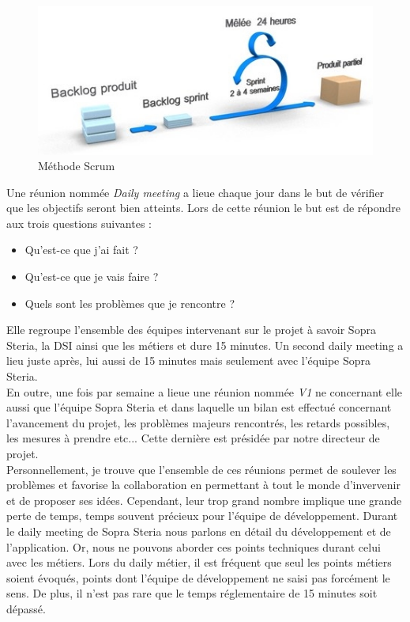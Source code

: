 \begin{figure}[h!]
	\includegraphics[scale=0.7]{images/travailBP1818/scrum.jpg}
	\centering
	\caption{Méthode Scrum}
	\label{scrum}
\end{figure}

	Une réunion nommée \textit{Daily meeting} a lieue chaque jour dans le but de vérifier que les objectifs seront bien atteints. Lors de cette réunion le but est de répondre aux trois questions suivantes : 
	\begin{itemize}
		\item Qu'est-ce que j'ai fait ?
		\item Qu'est-ce que je vais faire ?
		\item Quels sont les problèmes que je rencontre ?
	\end{itemize}
	Elle regroupe l'ensemble des équipes intervenant sur le projet à savoir Sopra Steria, la DSI ainsi que les métiers et dure 15 minutes. Un second daily meeting a lieu juste après, lui aussi de 15 minutes mais seulement avec l'équipe Sopra Steria. \\

	En outre, une fois par semaine a lieue une réunion nommée \textit{V1} ne concernant elle aussi que l'équipe Sopra Steria et dans laquelle un bilan est effectué concernant l'avancement du projet, les problèmes majeurs rencontrés, les retards possibles, les mesures à prendre etc... Cette dernière est présidée par notre directeur de projet. \\
	
	Personnellement, je trouve que l'ensemble de ces réunions permet de soulever les problèmes et favorise la collaboration en permettant à tout le monde d'invervenir et de proposer ses idées. Cependant, leur trop grand nombre implique une grande perte de temps, temps souvent précieux pour l'équipe de développement. Durant le daily meeting de Sopra Steria nous parlons en détail du développement et de l'application. Or, nous ne pouvons aborder ces points techniques durant celui avec les métiers. Lors du daily métier, il est fréquent que seul les points métiers soient évoqués, points dont l'équipe de développement ne saisi pas forcément le sens. De plus, il n'est pas rare que le temps réglementaire de 15 minutes soit dépassé. \\
	
